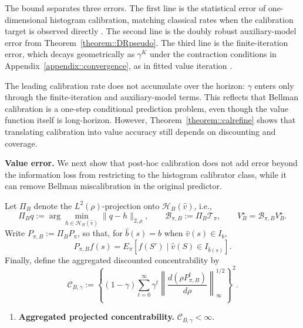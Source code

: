 \documentclass{article}
\theoremstyle{plain}
\theoremstyle{definition}
\theoremstyle{remark}
\begin{document}
The bound separates three errors. The first line is the statistical error of
one-dimensional histogram calibration, matching classical rates when the
calibration target is observed directly
\citep{gupta2020distribution,gupta2021distribution,van2025generalized}. The
second line is the doubly robust auxiliary-model error from
Theorem~\ref{theorem::DRpseudo}. The third line is the finite-iteration error,
which decays geometrically as $\gamma^K$ under the contraction conditions in
Appendix~\ref{appendix::convergence}, as in fitted value iteration
\citep{munos2008finite}.

The leading calibration rate does not accumulate over the horizon: \(\gamma\)
enters only through the finite-iteration and auxiliary-model terms. This reflects that
Bellman calibration is a one-step conditional prediction problem, even though
the value function itself is long-horizon. However, Theorem~\ref{theorem::calrefine}
shows that translating calibration into value accuracy still depends on
discounting and coverage.

\textbf{Value error.}
We next show that post-hoc calibration does not add error beyond the
information loss from restricting to the histogram calibrator class, while it can
remove Bellman miscalibration in the original predictor.

Let \(\Pi_B\) denote the \(L^2(\rho)\)-projection onto
\(\mathcal H_B(\hat v)\), i.e.,
\[
\Pi_B q:=\arg\min_{h\in\mathcal H_B(\hat v)}\|q-h\|_{2,\rho},
\qquad
\mathcal B_{\pi,B}:=\Pi_B\mathcal T_\pi,
\qquad
V_B^\star=\mathcal B_{\pi,B}V_B^\star .
\]
Write \(P_{\pi,B}:=\Pi_B P_\pi\), so that, for
\(\hat b(s)=b\) when \(\hat v(s)\in I_b\),
\[
P_{\pi,B}f(s)
=
E_\pi[f(S')\mid \hat v(S)\in I_{\hat b(s)}].
\]
Finally, define the aggregated discounted concentrability by
\[
\mathcal C_{B,\gamma}
:=
\left\{(1-\gamma)\sum_{t=0}^\infty
\gamma^t
\left\|
\frac{d(\rho P_{\pi,B}^t)}{d\rho}
\right\|_\infty^{1/2}
\right\}^2 .
\]

\begin{enumerate}[label=\textbf{C\arabic*}, ref={C\arabic*}, leftmargin=1.5em, resume=cond]
\item \label{cond::Ccoverage}
\textbf{Aggregated projected concentrability.}
\(\mathcal C_{B,\gamma} < \infty\).
\end{enumerate}
 
\end{document}
